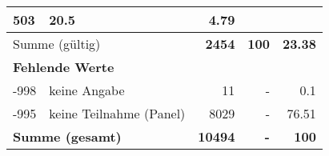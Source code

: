 \begin{longtable}{lXrrr}
       \num{503} &
       \num[round-mode=places,round-precision=2]{20.5} &
         \num[round-mode=places,round-precision=2]{4.79} \\
     \midrule
     \multicolumn{2}{l}{Summe (gültig)} &
       \textbf{\num{2454}} &
     \textbf{\num{100}} &
       \textbf{\num[round-mode=places,round-precision=2]{23.38}} \\
     \multicolumn{5}{l}{\textbf{Fehlende Werte}}\\
       -998 &
       keine Angabe &
         \num{11} &
        - &
         \num[round-mode=places,round-precision=2]{0.1} \\
       -995 &
       keine Teilnahme (Panel) &
         \num{8029} &
        - &
         \num[round-mode=places,round-precision=2]{76.51} \\
     \midrule
     \multicolumn{2}{l}{\textbf{Summe (gesamt)}} &
          \textbf{\num{10494}} &
        \textbf{-} &
        \textbf{\num{100}} \\
     \bottomrule
     \end{longtable}
     
